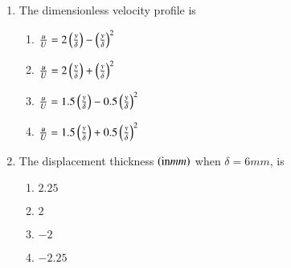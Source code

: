 \documentclass[journal]{IEEEtran}
\begin{document}
\begin{enumerate}[start=19]
\item The dimensionless velocity profile is
\begin{enumerate}
    \item $\frac{u}{U} = 2\left(\frac{y}{\delta}\right)-\left(\frac{y}{\delta}\right)^2$       
    \item $\frac{u}{U} = 2\left(\frac{y}{\delta}\right)+\left(\frac{y}{\delta}\right)^2$        
    \item $\frac{u}{U} = 1.5\left(\frac{y}{\delta}\right)-0.5\left(\frac{y}{\delta}\right)^2$        
    \item $\frac{u}{U} = 1.5\left(\frac{y}{\delta}\right)+0.5\left(\frac{y}{\delta}\right)^2$
\end{enumerate}
\item The displacement thickness $\left(\text{in} mm\right)$ when $\delta = 6 mm$, is
\begin{enumerate}
    \item $2.25$
    \item $2$
    \item $-2$
    \item $-2.25$
\end{enumerate}
\end{enumerate}
\end{document}
